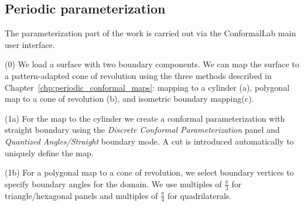 \documentclass[Thesis.tex]{subfiles}
\begin{document}
\subsection{Periodic parameterization}
The parameterization part of the work is carried out via the {\sc ConformalLab} main user interface. 

\begin{compactenum}[(1)]
\item[(0)] We load a surface with two boundary components. We can map the surface to a pattern-adapted cone of revolution using the three methods described in Chapter~\ref{chp:periodic_conformal_maps}: mapping to a cylinder (a), polygonal map to a cone of revolution (b), and isometric boundary mapping(c).
\item[(1a)] For the map to the cylinder we create a conformal parameterization with straight boundary using the \emph{Discrete Conformal Parameterization} panel and \emph{Quantized Angles/Straight} boundary mode. A cut is introduced automatically to uniquely define the map.\\

\begin{center}
\begin{minipage}{0.9\linewidth}
            \centering
            \label{fig:periodic_algorithm1a}
\end{minipage}
\end{center}            

\item[(1b)] For a polygonal map to a cone of revolution, we select boundary vertices to specify boundary angles for the domain. We use multiples of $\frac{\pi}{3}$ for triangle/hexagonal panels and multiples of $\frac{\pi}{4}$ for quadrilaterals.


\end{compactenum}
\end{document}
